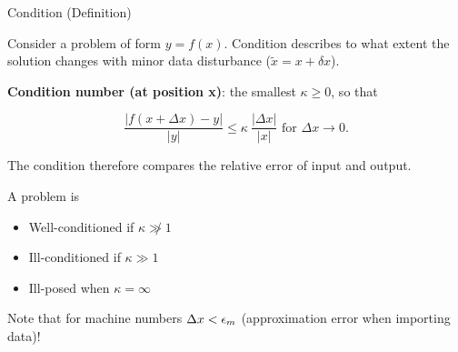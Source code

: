 \begin{vbframe}{Condition (Definition)}

Consider a problem of form $y = f(x)$. Condition describes to what extent the solution changes with minor data disturbance ($\tilde x = x + \delta x$).

\lz

\textbf{Condition number (at position x)}: the smallest $\kappa \geq 0$, so that

$$
\frac{|f(x+\Delta x)-y|}{|y|} \leq \kappa \ \frac{|\Delta x|}{|x|} \text{ for } \Delta x \to 0.
$$

The condition therefore compares the relative error of input and output.

A problem is

\begin{itemize}
\item Well-conditioned if $\kappa \not \gg 1$
\item Ill-conditioned if $\kappa \gg 1$
\item Ill-posed when $\kappa = \infty$
\end{itemize}

\begin{footnotesize}
Note that for machine numbers $\Delta x < \epsilon_m$ (approximation error when importing data)!
\end{footnotesize}


\end{vbframe}


